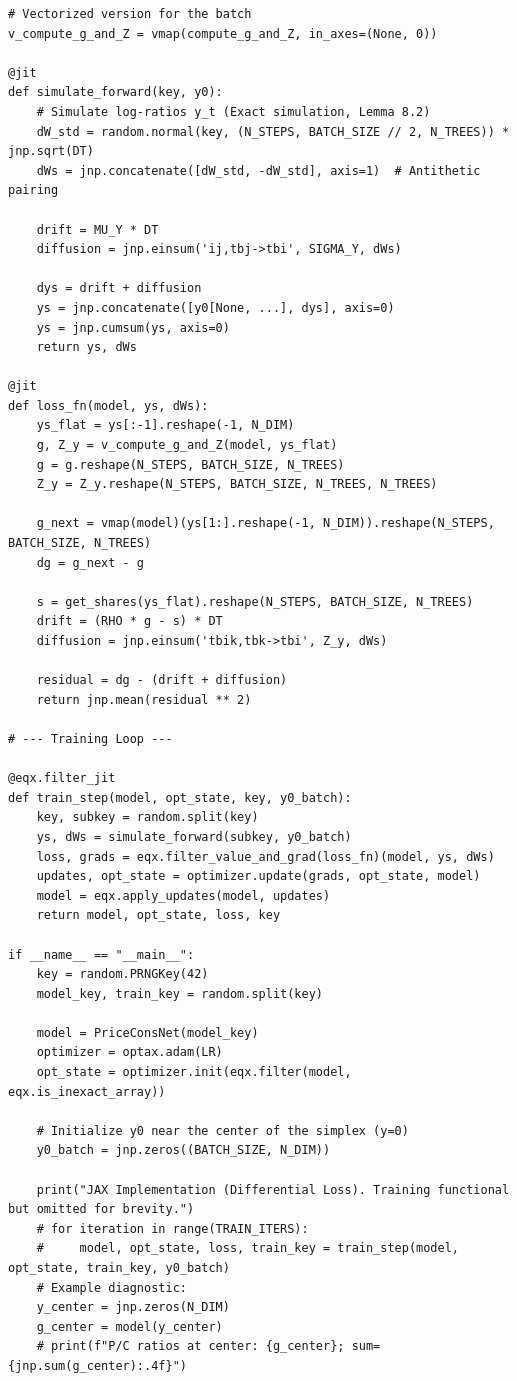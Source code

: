 \documentclass[11pt,letterpaper,oneside]{article}
\numberwithin{equation}{section}
\newcommand{\1}{\mathbf{1}}
\begin{document}
\begin{lstlisting}
# Vectorized version for the batch
v_compute_g_and_Z = vmap(compute_g_and_Z, in_axes=(None, 0))

@jit
def simulate_forward(key, y0):
    # Simulate log-ratios y_t (Exact simulation, Lemma 8.2)
    dW_std = random.normal(key, (N_STEPS, BATCH_SIZE // 2, N_TREES)) * jnp.sqrt(DT)
    dWs = jnp.concatenate([dW_std, -dW_std], axis=1)  # Antithetic pairing

    drift = MU_Y * DT
    diffusion = jnp.einsum('ij,tbj->tbi', SIGMA_Y, dWs)

    dys = drift + diffusion
    ys = jnp.concatenate([y0[None, ...], dys], axis=0)
    ys = jnp.cumsum(ys, axis=0)
    return ys, dWs

@jit
def loss_fn(model, ys, dWs):
    ys_flat = ys[:-1].reshape(-1, N_DIM)
    g, Z_y = v_compute_g_and_Z(model, ys_flat)
    g = g.reshape(N_STEPS, BATCH_SIZE, N_TREES)
    Z_y = Z_y.reshape(N_STEPS, BATCH_SIZE, N_TREES, N_TREES)

    g_next = vmap(model)(ys[1:].reshape(-1, N_DIM)).reshape(N_STEPS, BATCH_SIZE, N_TREES)
    dg = g_next - g

    s = get_shares(ys_flat).reshape(N_STEPS, BATCH_SIZE, N_TREES)
    drift = (RHO * g - s) * DT
    diffusion = jnp.einsum('tbik,tbk->tbi', Z_y, dWs)

    residual = dg - (drift + diffusion)
    return jnp.mean(residual ** 2)

# --- Training Loop ---

@eqx.filter_jit
def train_step(model, opt_state, key, y0_batch):
    key, subkey = random.split(key)
    ys, dWs = simulate_forward(subkey, y0_batch)
    loss, grads = eqx.filter_value_and_grad(loss_fn)(model, ys, dWs)
    updates, opt_state = optimizer.update(grads, opt_state, model)
    model = eqx.apply_updates(model, updates)
    return model, opt_state, loss, key

if __name__ == "__main__":
    key = random.PRNGKey(42)
    model_key, train_key = random.split(key)

    model = PriceConsNet(model_key)
    optimizer = optax.adam(LR)
    opt_state = optimizer.init(eqx.filter(model, eqx.is_inexact_array))

    # Initialize y0 near the center of the simplex (y=0)
    y0_batch = jnp.zeros((BATCH_SIZE, N_DIM))

    print("JAX Implementation (Differential Loss). Training functional but omitted for brevity.")
    # for iteration in range(TRAIN_ITERS):
    #     model, opt_state, loss, train_key = train_step(model, opt_state, train_key, y0_batch)
    # Example diagnostic:
    y_center = jnp.zeros(N_DIM)
    g_center = model(y_center)
    # print(f"P/C ratios at center: {g_center}; sum={jnp.sum(g_center):.4f}")
\end{lstlisting}
\end{document}
